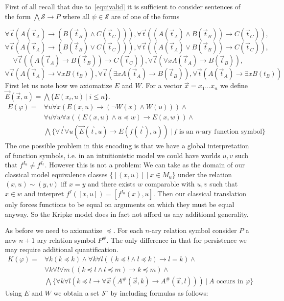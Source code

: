 \documentclass[a4paper,12pt]{report}
\theoremstyle{definition}
\theoremstyle{definition}
\theoremstyle{definition}
\theoremstyle{definition}
\theoremstyle{definition}
\theoremstyle{definition}
\theoremstyle{definition}
\begin{document}
	First of all recall that due to~\ref{equivalid} it is sufficient to consider sentences of the form $\bigwedge\mathcal S\to P$ where all $\psi\in\mathcal S$ are of one of the forms
	
	$$\forall \vec t(A(\vec t_{A})\to (B(\vec t_B)\wedge C(\vec t_C))), \forall \vec t((A(\vec t_{A})\wedge B(\vec t_B))\to C(\vec t_C)),$$$$ \forall \vec t(A(\vec t_{A})\to (B(\vec t_B)\vee C(\vec t_C))),
	\forall \vec t((A(\vec t_{A})\vee B(\vec t_B))\to C(\vec t_C)),$$$$ \forall \vec t((A(\vec t_A)\to B(\vec t_B))\to C(\vec t_C)),\forall \vec t(\forall xA(\vec t_A)\to B(\vec t_B)),$$$$ \forall \vec t(A(\vec t_A)\to\forall xB(t_B)), \forall \vec t(\exists xA(\vec t_A)\to B(\vec t_B)), \forall \vec t(A(\vec t_A)\to\exists xB(t_B))$$	
	First let us note how we axiomatize $E$ and $W$. For a vector $\vec x = x_1\dots x_n$ we define $\vec E(\vec x, u) = \bigwedge\{E(x_i, u)\:|\:i\leq n\}$.
	\begin{align*}
		E(\varphi) = & \forall u\forall x(E(x, u)\to(\neg W(x)\wedge W(u)))\wedge\\
		 & \forall u\forall w\forall x((E(x, u)\wedge u\preceq w)\to E(x, w))\wedge\\
		 & \bigwedge\{\forall\vec t\forall u(\vec E(\vec t, u)\to E(f(\vec t), u))\:|\:\text{$f$ is an $n$-ary function symbol}\}
	\end{align*}
	The one possible problem in this encoding is that we have a global interpretation of function symbols, i.e. in an intuitionistic model we could have worlds $u, v$ such that $f^{I_u}\neq f^{I_v}$. However this is not a problem: We can take as the domain of our classical model equivalence classes $\{[(x, u)]\:|\: x\in M_u\}$ under the relation $(x, u)\sim (y, v)$ iff $x = y$ and there exists $w$ comparable with $u, v$ such that $x\in w$ and interpret $f^I([x, u]) = [f^{I_u}(x), u]$. Then our classical translation only forces functions to be equal on arguments on which they must be equal anyway. So the Kripke model does in fact not afford us any additional generality.

	As before we need to axiomatize $\preceq$. For each $n$-ary relation symbol consider $P$ a new $n+1$ ary relation symbol $P^\#$.  The only difference in that for persistence we may require additional quantification. 
	\begin{align*}
		K(\varphi) = & \forall k(k\preceq k)\wedge \forall k\forall l((k\preceq l\wedge l\preceq k)\to l = k)\wedge\\
		& \forall k\forall l\forall m((k\preceq l\wedge l\preceq m)\to k\preceq m)\wedge\\
		& \bigwedge\{\forall k\forall l(k\preceq l\to \forall \vec x(A^\#(\vec x, k)\to A^\#(\vec x, l)))\:|\:\text{$A$ occurs in $\varphi$}\}
	\end{align*}
	Using $E$ and $W$ we obtain a set $\mathcal S^\circ$ by including formulas as follows:
	
\end{document}
